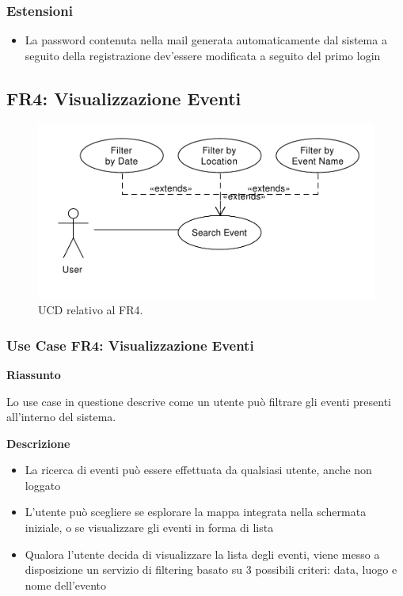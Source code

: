 \documentclass[9pt]{extarticle}
\begin{document}
\subsubsection*{Estensioni}\label{Estensioni-FR2}

\begin{itemize}
	\item La password contenuta nella mail generata automaticamente dal sistema a seguito della registrazione dev'essere modificata a seguito del primo login
\end{itemize}

\subsection{FR4: Visualizzazione Eventi}

\begin{figure}[!htb]
	\centering
	\includegraphics[width=.7\linewidth]{./images/FR4.pdf}
	\caption{UCD relativo al FR4.}
	\label{fig:UCD_FR4}
\end{figure}

\subsubsection*{Use Case FR4: Visualizzazione Eventi}

\textbf{Riassunto}

Lo use case in questione descrive come un utente può filtrare gli eventi presenti all'interno del sistema.

\textbf{Descrizione}

\begin{itemize}
	\item La ricerca di eventi può essere effettuata da qualsiasi utente, anche non loggato
	\item L'utente può scegliere se esplorare la mappa integrata nella schermata iniziale, o se visualizzare gli eventi in forma di lista
	\item Qualora l'utente decida di visualizzare la lista degli eventi, viene messo a disposizione un servizio di filtering basato su 3 possibili criteri: data, luogo e nome dell'evento
\end{itemize}
\end{document}
